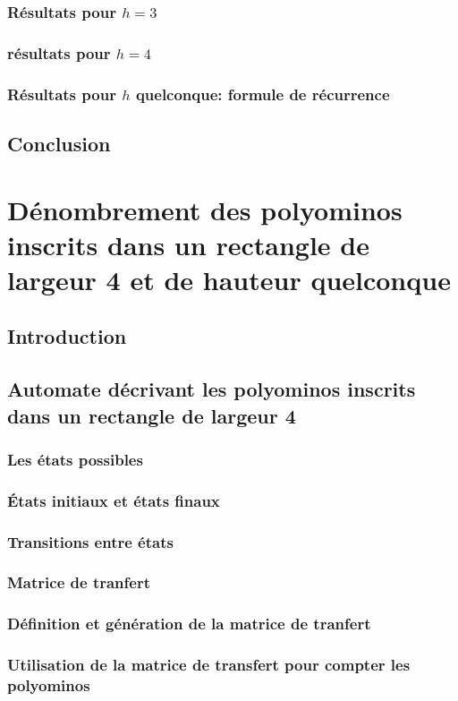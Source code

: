 \documentclass[12pt]{memoireuqam1.3}
\begin{document}
\subsection{Résultats pour $h=3$}
\subsection{résultats pour $h=4$}
\subsection{Résultats pour $h$ quelconque: formule de récurrence }
\section*{Conclusion}
\chapter{Dénombrement des polyominos inscrits dans un rectangle de largeur 4 et de hauteur quelconque}
\section*{Introduction}
\section{Automate décrivant les polyominos inscrits dans un rectangle de largeur 4}
\subsection{Les états possibles}
\subsection{États initiaux et états finaux}
\subsection{Transitions entre états}
\subsection{Matrice de tranfert}
\subsection{Définition et génération de la matrice de tranfert}
\subsection{Utilisation de la matrice de transfert pour compter les polyominos}
\end{document}
